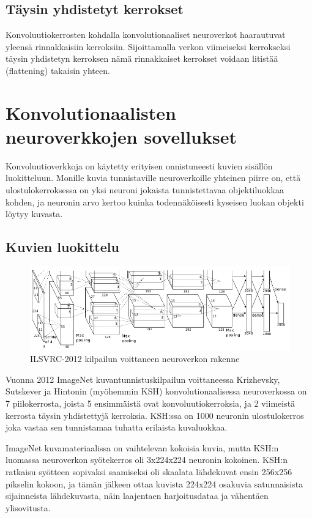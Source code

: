 \documentclass[finnish]{tktltiki2}
\theoremstyle{definition}
\theoremstyle{remark}
\begin{document}
    \subsection{Täysin yhdistetyt kerrokset}
    Konvoluutiokerrosten kohdalla konvolutionaaliset neuroverkot haarautuvat yleensä rinnakkaisiin kerroksiin. Sijoittamalla verkon viimeiseksi kerrokseksi täysin yhdistetyn kerroksen nämä rinnakkaiset kerrokset voidaan litistää (flattening) takaisin yhteen.

  \section{Konvolutionaalisten neuroverkkojen sovellukset}
    Konvoluutioverkkoja on käytetty erityisen onnistuneesti kuvien sisällön luokitteluun. Monille kuvia tunnistaville neuroverkoille yhteinen piirre on, että ulostulokerroksessa on yksi neuroni jokaista tunnistettavaa objektiluokkaa kohden, ja neuronin arvo kertoo kuinka todennäköisesti kyseisen luokan objekti löytyy kuvasta.

  \subsection{Kuvien luokittelu}

    \begin{figure}[h]
    \centering
    \includegraphics[scale=0.4]{imagenet}
    \caption{ILSVRC-2012 kilpailun voittaneen neuroverkon rakenne \cite{KSHimagenet2012}}
    \label{pic:hsk-neuralnet}
    \end{figure}

    Vuonna 2012 ImageNet kuvantunnistuskilpailun voittaneessa Krizhevsky, Sutskever ja Hintonin (myöhemmin KSH) konvolutionaalisessa neuroverkossa on 7 piilokerrosta, joista 5 ensimmäistä ovat konvoluutiokerroksia, ja 2 viimeistä kerrosta täysin yhdistettyjä kerroksia. KSH:ssa on 1000 neuronin ulostulokerros joka vastaa sen tunnistamaa tuhatta erilaista kuvaluokkaa.
    
    ImageNet kuvamateriaalissa on vaihtelevan kokoisia kuvia, mutta KSH:n luomassa neuroverkon syötekerros oli 3x224x224 neuronin kokoinen. KSH:n ratkaisu syötteen sopivaksi saamiseksi oli skaalata lähdekuvat ensin 256x256 pikselin kokoon, ja tämän jälkeen ottaa kuvista 224x224 osakuvia satunnaisista sijainneista lähdekuvasta, näin laajentaen harjoitusdataa ja vähentäen ylisovitusta.
    
\end{document}
